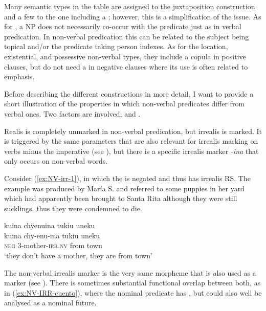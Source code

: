 Many semantic types in the table are assigned to the juxtaposition construction and a few to the one including a ; however, this is a simplification of the issue. As for , a  NP does not necessarily co-occur with the predicate just as in verbal predication. In non-verbal predication this can be related to the subject being topical and/or the predicate taking person indexes. As for the location, existential, and possessive non-verbal types, they include a copula in positive clauses, but do not need a  in negative clauses where its use is often related to emphasis.

Before describing the different constructions in more detail, I want to provide a short illustration of the properties in which non-verbal predicates differ from verbal ones. Two factors are involved,  and .

\hspace*{-.3pt}Realis is completely unmarked in non-verbal predication, but irrealis is marked. It is triggered by the same parameters that are also relevant for irrealis marking on verbs minus the imperative (see ), but there is a specific irrealis marker \textit{-ina} that only occurs on non-verbal words.

Consider (\ref{ex:NV-irr-1}), in which the  is negated and thus has irrealis RS. The example was produced by María S. and referred to some puppies in her yard which had apparently been brought to Santa Rita although they were still sucklings, thus they were condemned to die.

\ea\label{ex:NV-irr-1}
\begingl
\glpreamble kuina chÿenuina tukiu uneku\\
\gla kuina chÿ-enu-ina tukiu uneku\\
\glb \textsc{neg} 3-mother-\textsc{irr.nv} from town\\
\glft ‘they don’t have a mother, they are from town’
\endgl
\trailingcitation{[rxx-e120511l.363]}
\xe

The non-verbal irrealis marker is the very same morpheme that is also used as a  marker (see ). There is sometimes substantial functional overlap between both, as in (\ref{ex:NV-IRR-cuento}), where the nominal predicate has , but could also well be analysed as a nominal future.

